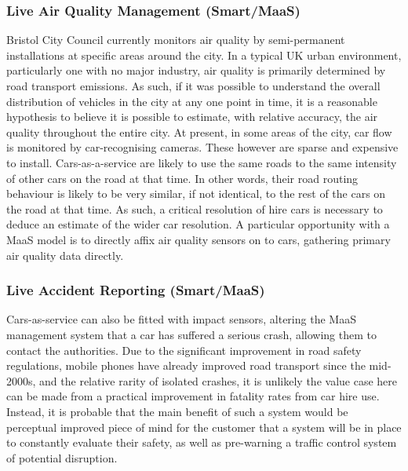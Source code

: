 \documentclass[journal]{IEEEtran}
\begin{document}
\subsubsection{Live Air Quality Management (Smart/MaaS)}

Bristol City Council currently monitors air quality by semi-permanent
installations at specific areas around the city. In a typical UK urban
environment, particularly one with no major industry, air quality is
primarily determined by road transport emissions. As such, if it was
possible to understand the overall distribution of vehicles in the
city at any one point in time, it is a reasonable hypothesis to
believe it is possible to estimate, with relative accuracy, the air
quality throughout the entire city. At present, in some areas of the
city, car flow is monitored by car-recognising cameras. These however
are sparse and expensive to install. Cars-as-a-service are likely to
use the same roads to the same intensity of other cars on the road at
that time. In other words, their road routing behaviour is likely to be
very similar, if not identical, to the rest of the cars on the road at
that time. As such, a critical resolution of hire cars is necessary to
deduce an estimate of the wider car resolution. A particular
opportunity with a MaaS model is to directly affix air quality sensors
on to cars, gathering primary air quality data directly.



\subsubsection{Live Accident Reporting (Smart/MaaS)}

Cars-as-service can also be fitted with impact sensors, altering the
MaaS management system that a car has suffered a serious crash,
allowing them to contact the authorities. Due to the significant
improvement in road safety regulations, mobile phones have already
improved road transport since the mid-2000s, and the relative rarity
of isolated crashes, it is unlikely the value case here can be made
from a practical improvement in fatality rates from car hire
use. Instead, it is probable that the main benefit of such a system
would be perceptual improved piece of mind for the customer that a
system will be in place to constantly evaluate their safety, as well
as pre-warning a traffic control system of potential disruption.
\end{document}
